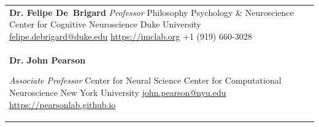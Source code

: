 \documentclass[margin]{res}
\begin{document}
\begin{resume}
\begin{tabular}{p{6cm} p{5.5cm}}
    \textbf{Dr. Felipe De~Brigard}\newline
    \small{
      \emph{Professor}\newline
      Philosophy\newline
      Psychology \& Neuroscience\newline
      Center for Cognitive Neuroscience\newline
      Duke University\newline
      \href{mailto:felipe.debrigard@duke.edu}{felipe.debrigard@duke.edu} \newline
      \url{https://imclab.org}\newline
      +1 (919) 660-3028
    }
    \\

    \vspace{\baselineskip}
    \textbf{Dr. John Pearson}\newline
    \small{
      \emph{Associate Professor}\newline
      Center for Neural Science \newline
      Center for Computational Neuroscience \newline
      New York University\newline
      \href{mailto:john.pearson@nyu.edu}{john.pearson@nyu.edu}\newline
      \url{https://pearsonlab.github.io}\newline
      
    }
  \end{tabular}
\end{resume}
\end{document}

